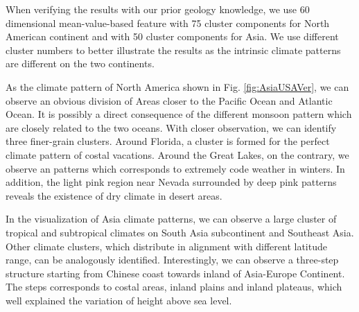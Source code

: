 When verifying the results with our prior geology knowledge, we use 60 dimensional mean-value-based feature with 75 cluster components for North American continent and with 50 cluster components for Asia. We use different cluster numbers to better illustrate the results as the intrinsic climate patterns are different on the two continents.

As the climate pattern of North America shown in Fig. \ref{fig:AsiaUSAVer}, we can observe an obvious division of Areas closer to the Pacific Ocean and Atlantic Ocean. It is possibly a direct consequence of the different monsoon pattern which are closely related to the two oceans. With closer observation, we can identify three finer-grain clusters. Around Florida, a cluster is formed for the perfect climate pattern of costal vacations. Around the Great Lakes, on the contrary, we observe an patterns which corresponds to extremely code weather in winters. In addition, the light pink region near Nevada surrounded by deep pink patterns reveals the existence of dry climate in desert areas.

In the visualization of Asia climate patterns, we can observe a large cluster of tropical and subtropical climates on South Asia subcontinent and Southeast Asia. Other climate clusters, which distribute in alignment with different latitude range, can be analogously identified. Interestingly, we can observe a three-step structure starting from Chinese coast towards inland of Asia-Europe Continent. The steps corresponds to costal areas, inland plains and inland plateaus, which well explained the variation of height above sea level.

